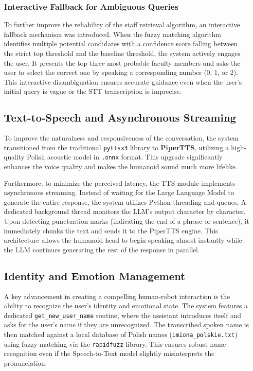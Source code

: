 \documentclass{article}
\begin{document}
\subsubsection*{Interactive Fallback for Ambiguous Queries}
To further improve the reliability of the staff retrieval algorithm, an interactive fallback mechanism was introduced. When the fuzzy matching algorithm identifies multiple potential candidates with a confidence score falling between the strict top threshold and the baseline threshold, the system actively engages the user. It presents the top three most probable faculty members and asks the user to select the correct one by speaking a corresponding number (0, 1, or 2). This interactive disambiguation ensures accurate guidance even when the user's initial query is vague or the STT transcription is imprecise.
	
	\subsection{Text-to-Speech and Asynchronous Streaming}
	To improve the naturalness and responsiveness of the conversation, the system transitioned from the traditional \texttt{pyttsx3} library to \textbf{PiperTTS}, utilizing a high-quality Polish acoustic model in \texttt{.onnx} format. This upgrade significantly enhances the voice quality and makes the humanoid sound much more lifelike.
	
	Furthermore, to minimize the perceived latency, the TTS module implements asynchronous streaming. Instead of waiting for the Large Language Model to generate the entire response, the system utilizes Python threading and queues. A dedicated background thread monitors the LLM's output character by character. Upon detecting punctuation marks (indicating the end of a phrase or sentence), it immediately chunks the text and sends it to the PiperTTS engine. This architecture allows the humanoid head to begin speaking almost instantly while the LLM continues generating the rest of the response in parallel.
	
	\subsection{Identity and Emotion Management}
	A key advancement in creating a compelling human-robot interaction is the ability to recognize the user's identity and emotional state. The system features a dedicated \texttt{get\_new\_user\_name} routine, where the assistant introduces itself and asks for the user's name if they are unrecognized. The transcribed spoken name is then matched against a local database of Polish names (\texttt{imiona\_polskie.txt}) using fuzzy matching via the \texttt{rapidfuzz} library. This ensures robust name recognition even if the Speech-to-Text model slightly misinterprets the pronunciation.
	
\end{document}
